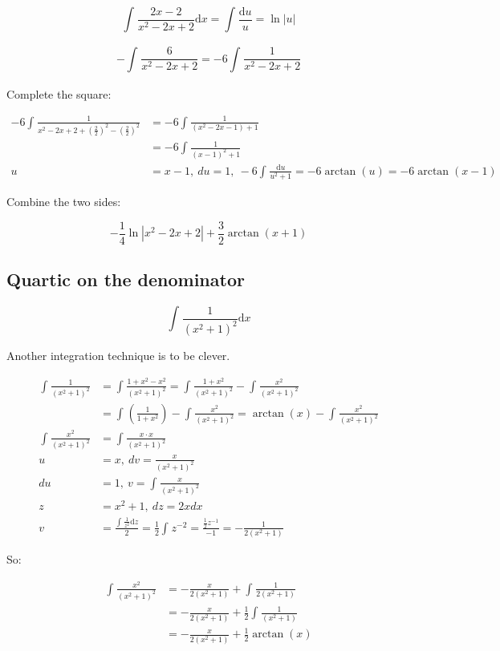 \documentclass[12pt]{article}
\theoremstyle{plain}
\theoremstyle{remark}
\theoremstyle{definition}
\begin{document}
\[\int_{}^{}{\frac{2x - 2}{x^{2} - 2x + 2}\text{d}x} = \int_{}^{}\frac{\text{d}u}{u} = \ln|u|\]

\[- \int_{}^{}\frac{6}{x^{2} - 2x + 2} = - 6\int_{}^{}\frac{1}{x^{2} - 2x + 2}\]

Complete the square:

\begin{align*}
- 6\int_{}^{}\frac{1}{x^{2} - 2x + 2 + \left( \frac{2}{2} \right)^{2} - \left( \frac{2}{2} \right)^{2}} &= - 6\int_{}^{}\frac{1}{\left( x^{2} - 2x - 1 \right) + 1} \\
&= - 6\int_{}^{}\frac{1}{(x - 1)^{2} + 1} \\
u &= x - 1,\ du = 1,\  - 6\int_{}^{}\frac{\text{d}u}{u^{2} + 1} = - 6\arctan(u) = - 6\arctan(x - 1)
\end{align*}


Combine the two sides:

\[- \frac{1}{4}\ln\left| x^{2} - 2x + 2 \right| + \frac{3}{2}\arctan(x + 1)\]


\subsection{Quartic on the
denominator}

\[\int_{}^{}{\frac{1}{\left( x^{2} + 1 \right)^{2}}\text{d}x}\]

Another integration technique is to be clever.

\begin{align*}
\int_{}^{}\frac{1}{\left( x^{2} + 1 \right)^{2}} &= \int_{}^{}\frac{1 + x^{2} - x^{2}}{\left( x^{2} + 1 \right)^{2}} = \int_{}^{}\frac{1 + x^{2}}{\left( x^{2} + 1 \right)^{2}} - \int_{}^{}\frac{x^{2}}{\left( x^{2} + 1 \right)^{2}} \\
&= \int_{}^{}{\left( \frac{1}{1 + x^{2}} \right) - \int_{}^{}\frac{x^{2}}{\left( x^{2} + 1 \right)^{2}}} = \arctan(x) - \int_{}^{}\frac{x^{2}}{\left( x^{2} + 1 \right)^{2}}
 \\
\int_{}^{}\frac{x^{2}}{\left( x^{2} + 1 \right)^{2}} &= \int_{}^{}\frac{x \cdot x}{\left( x^{2} + 1 \right)^{2}} \\
u &= x,\ dv = \frac{x}{\left( x^{2} + 1 \right)^{2}} \\
du &= 1,\ v = \int_{}^{}\frac{x}{\left( x^{2} + 1 \right)^{2}} \\
z &= x^{2} + 1,\ dz = 2xdx \\
v &= \frac{\int_{}^{}{\frac{1}{z^{2}}\text{d}z}}{2} = \frac{1}{2}\int_{}^{}z^{- 2} = \frac{\frac{1}{2}z^{- 1}}{- 1} = - \frac{1}{2\left( x^{2} + 1 \right)}
\end{align*}


So:

\begin{align*}
\int_{}^{}\frac{x^{2}}{\left( x^{2} + 1 \right)^{2}} &= - \frac{x}{2\left( x^{2} + 1 \right)} + \int_{}^{}\frac{1}{2\left( x^{2} + 1 \right)} \\
&= - \frac{x}{2\left( x^{2} + 1 \right)} + \frac{1}{2}\int_{}^{}\frac{1}{\left( x^{2} + 1 \right)} \\
&= - \frac{x}{2\left( x^{2} + 1 \right)} + \frac{1}{2}\arctan(x)
\end{align*}
\end{document}
